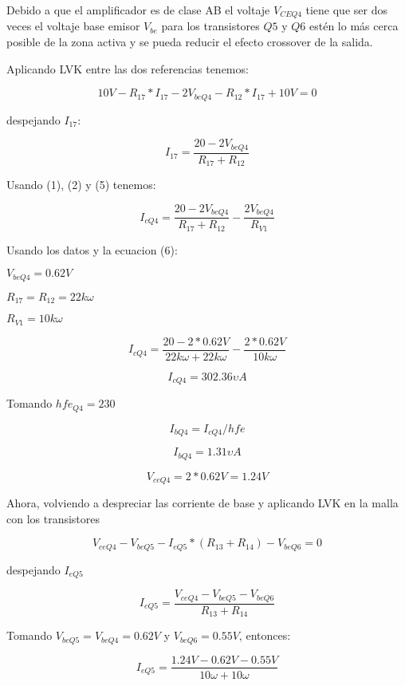 \documentclass{article}
\begin{document}
Debido a que el amplificador es de clase AB el voltaje $V_{CEQ4}$ tiene que ser dos veces el voltaje base emisor $V_{be}$ para los transistores $Q5$ y $Q6$ estén lo más cerca posible de la zona activa y se pueda reducir el efecto crossover de la salida.

Aplicando LVK entre las dos referencias tenemos:

$$10V - R_{17}*I_{17} - 2V_{beQ4} - R_{12}*I_{17} + 10V = 0$$

despejando $I_{17}$:

\begin{equation}
    I_{17} = \frac{20 - 2V_{beQ4}}{R_{17} + R_{12}}
\end{equation}

Usando (1), (2) y (5) tenemos:

\begin{equation}
    I_{cQ4} = \frac{20 - 2V_{beQ4}}{R_{17} + R_{12}} - \frac{2V_{beQ4}}{R_{V1}}
\end{equation}

Usando los datos y la ecuacion (6):

$V_{beQ4} = 0.62 V$ 

$R_{17} = R_{12} = 22k\omega$ 

$R_{V1} = 10k\omega$ 

$$    I_{cQ4} = \frac{20 - 2 * 0.62 V}{22k\omega + 22k\omega} - \frac{2 * 0.62 V}{10 k\omega} $$

$$ I_{cQ4} = 302.36 \upsilon A$$

Tomando $hfe_{Q4} = 230$

\begin{equation}
    I_{bQ4} = I_{cQ4} / hfe
\end{equation}

$$ I_{bQ4} = 1.31 \upsilon A$$

$$ V_{ceQ4} = 2 * 0.62 V = 1.24 V$$

Ahora, volviendo a despreciar las corriente de base y aplicando LVK en la malla con los transistores

$$V_{ceQ4} - V_{beQ5} - I_{eQ5}* (R_{13} + R_{14}) - V_{beQ6} = 0$$

despejando $I_{eQ5}$ 

\begin{equation}
    I_{eQ5} =\frac{ V_{ceQ4} - V_{beQ5} - V_{beQ6} }{R_{13} + R_{14}}
\end{equation}

Tomando $V_{beQ5} = V_{beQ4} = 0.62 V$ y $V_{beQ6} = 0.55 V$, entonces: 

$$I_{eQ5} = \frac{ 1.24 V - 0.62 V - 0.55 V }{10 \omega + 10 \omega }$$
\end{document}
